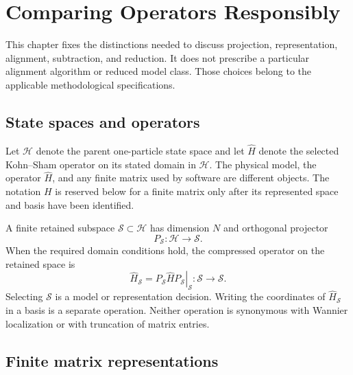 \chapter{Comparing Operators Responsibly}

\label{ch:mathematical-foundations}


This chapter fixes the distinctions needed to discuss projection,
representation, alignment, subtraction, and reduction. It does not prescribe a
particular alignment algorithm or reduced model class. Those choices belong to
the applicable methodological specifications.

\section{State spaces and operators}


Let $\mathcal H$ denote the parent one-particle state space and let
$\widehat H$ denote the selected Kohn--Sham operator on its stated domain in
$\mathcal H$. The physical model, the operator $\widehat H$, and any finite
matrix used by software are different objects. The notation $H$ is reserved
below for a finite matrix only after its represented space and basis have been
identified.

A finite retained subspace $\mathcal S\subset\mathcal H$ has dimension $N$ and
orthogonal projector
\begin{equation}
  P_{\mathcal S}:\mathcal H\longrightarrow\mathcal S.
\end{equation}
When the required domain conditions hold, the compressed operator on the
retained space is
\begin{equation}
  \widehat H_{\mathcal S}
  =
  \left.P_{\mathcal S}\widehat H P_{\mathcal S}\right|_{\mathcal S}
  :\mathcal S\longrightarrow\mathcal S.
\end{equation}
Selecting $\mathcal S$ is a model or representation decision. Writing the
coordinates of $\widehat H_{\mathcal S}$ in a basis is a separate operation.
Neither operation is synonymous with Wannier localization or with truncation of
matrix entries.

\section{Finite matrix representations}


